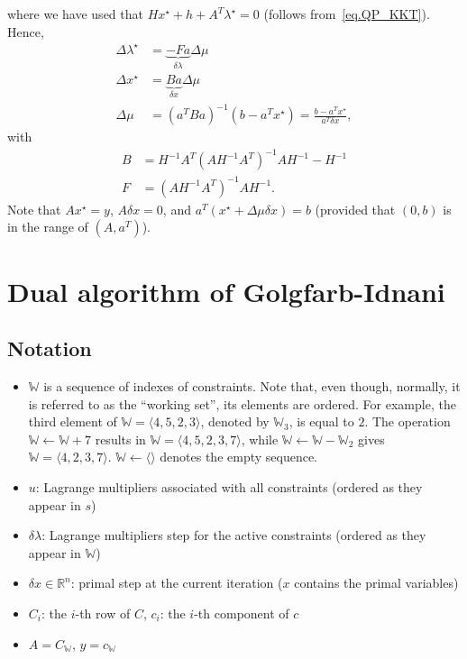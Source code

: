 \documentclass[12pt,a4paper]{article}
\begin{document}
%
where we have used that $Hx^{\star} + h + A^T\lambda^{\star} = 0$ (follows
from~\eqref{eq.QP_KKT}). Hence,
%
\begin{align}
  \Delta \lambda^{\star} &= \underbrace{-F a}_{\delta \lambda} \Delta \mu \label{eq.delta_lambda} \\
  \Delta x^{\star} &= \underbrace{Ba}_{\delta x} \Delta \mu \label{eq.delta_x} \\
  \Delta \mu &= (a^T Ba)^{-1}(b - a^Tx^{\star}) = \frac{b - a^Tx^{\star}}{a^T\delta x}, \label{eq.delta_mu}
\end{align}
%
with
%
\begin{align}
  B &= H^{-1}A^T(AH^{-1}A^T)^{-1}AH^{-1} - H^{-1} \label{eq.B}\\
  F &= (AH^{-1}A^T)^{-1}AH^{-1}. \label{eq.F}
\end{align}
%
Note that $Ax^{\star} = y$, $A\delta x = 0$, and $a^T(x^{\star} + \Delta
\mu\delta x) = b$ (provided that $(0,b)$ is in the range of $(A,a^T)$).

\section{Dual algorithm of Golgfarb-Idnani}

\subsection{Notation}

\begin{itemize}
\item $\mathbb{W}$ is a sequence of indexes of constraints. Note that, even
  though, normally, it is referred to as the ``working set'', its elements are
  ordered. For example, the third element of $\mathbb{W} =
  \langle4,5,2,3\rangle$, denoted by $\mathbb{W}_3$, is equal to $2$. The
  operation $\mathbb{W} \leftarrow \mathbb{W} + 7$ results in $\mathbb{W} =
  \langle4,5,2,3,7\rangle$, while $\mathbb{W} \leftarrow \mathbb{W} -
  \mathbb{W}_{2}$ gives $\mathbb{W} = \langle4,2,3,7\rangle$. $\mathbb{W}
  \leftarrow \langle\rangle$ denotes the empty sequence.
\item $u$: Lagrange multipliers associated with all constraints (ordered as they appear in $s$)
\item $\delta\lambda$: Lagrange multipliers step for the active constraints (ordered as they appear in $\mathbb{W}$)
\item $\delta x \in \mathbb{R}^{n}$: primal step at the current iteration ($x$ contains the primal variables)
\item $C_i$: the $i$-th row of $C$, $c_i$: the $i$-th component of $c$
\item $A = C_{\mathbb{W}}$, $y = c_{\mathbb{W}}$
\end{itemize}
\end{document}
